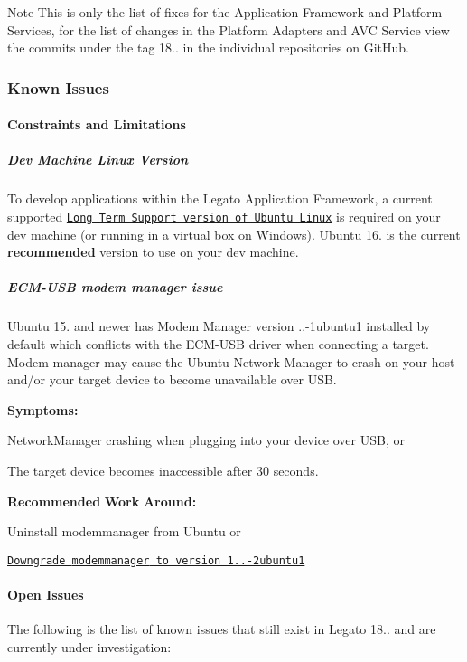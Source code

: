 \begin{DoxyNote}{Note}
This is only the list of fixes for the Application Framework and Platform Services, for the list of changes in the Platform Adapters and A\+VC Service view the commits under the tag 18.. in the individual repositories on Git\+Hub.
\end{DoxyNote}
\hypertarget{releaseNotes18020_rn1802_KnownIssues}{}\subsubsection{Known Issues}\label{releaseNotes18020_rn1802_KnownIssues}
\hypertarget{releaseNotes18020_rn1802_Constraints}{}\paragraph{Constraints and Limitations}\label{releaseNotes18020_rn1802_Constraints}
\hypertarget{releaseNotes18020_rn1802_ContraintsLinuxSupport}{}\subparagraph{Dev Machine Linux Version}\label{releaseNotes18020_rn1802_ContraintsLinuxSupport}
To develop applications within the Legato Application Framework, a current supported \href{https://www.ubuntu.com/info/release-end-of-life}{\tt Long Term Support version of Ubuntu Linux} is required on your dev machine (or running in a virtual box on Windows). Ubuntu 16. is the current {\bfseries recommended} version to use on your dev machine.\hypertarget{releaseNotes18020_rn1802_ConstECMUSB}{}\subparagraph{E\+C\+M-\/\+U\+S\+B modem manager issue}\label{releaseNotes18020_rn1802_ConstECMUSB}
Ubuntu 15. and newer has Modem Manager version {..-\/1ubuntu1} installed by default which conflicts with the E\+C\+M-\/\+U\+SB driver when connecting a target. Modem manager may cause the Ubuntu Network Manager to crash on your host and/or your target device to become unavailable over U\+SB.

{\bfseries Symptoms\+:} 
\begin{DoxyItemize}
\item Network\+Manager crashing when plugging into your device over U\+SB, or
\item The target device becomes inaccessible after 30 seconds.
\end{DoxyItemize}

{\bfseries Recommended} {\bfseries Work} {\bfseries Around\+:} 
\begin{DoxyItemize}
\item Uninstall {\ttfamily modemmanager} from Ubuntu or
\item \href{http://packages.ubuntu.com/trusty/modemmanager}{\tt Downgrade {\ttfamily modemmanager} to version 1..-\/2ubuntu1}
\end{DoxyItemize}\hypertarget{releaseNotes18020_rn1802_OpenIssues}{}\paragraph{Open Issues}\label{releaseNotes18020_rn1802_OpenIssues}
The following is the list of known issues that still exist in Legato 18.. and are currently under investigation\+:

